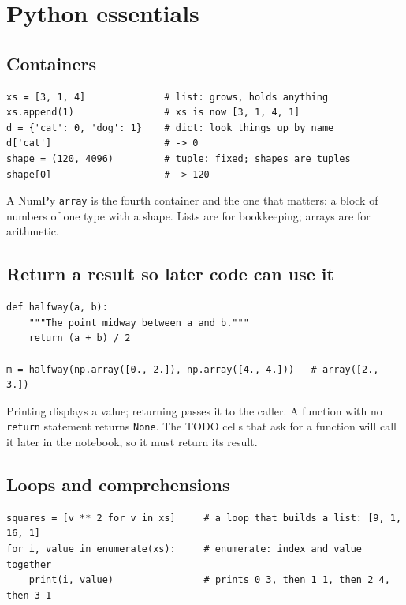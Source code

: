 \documentclass[11pt]{article}
\begin{document}
\section{Python essentials}\label{sec:python}

\subsection{Containers}

\begin{codebox}
\begin{verbatim}
xs = [3, 1, 4]              # list: grows, holds anything
xs.append(1)                # xs is now [3, 1, 4, 1]
d = {'cat': 0, 'dog': 1}    # dict: look things up by name
d['cat']                    # -> 0
shape = (120, 4096)         # tuple: fixed; shapes are tuples
shape[0]                    # -> 120
\end{verbatim}
\end{codebox}

A NumPy \texttt{array} is the fourth container and the one that matters: a block of
numbers of one type with a shape. Lists are for bookkeeping; arrays are for arithmetic.

\subsection{Return a result so later code can use it}

\begin{codebox}
\begin{verbatim}
def halfway(a, b):
    """The point midway between a and b."""
    return (a + b) / 2

m = halfway(np.array([0., 2.]), np.array([4., 4.]))   # array([2., 3.])
\end{verbatim}
\end{codebox}

Printing displays a value; returning passes it to the caller. A function with no
\texttt{return} statement returns \texttt{None}. The TODO cells that ask for a function
will call it later in the notebook, so it must return its result.

\subsection{Loops and comprehensions}

\begin{codebox}
\begin{verbatim}
squares = [v ** 2 for v in xs]     # a loop that builds a list: [9, 1, 16, 1]
for i, value in enumerate(xs):     # enumerate: index and value together
    print(i, value)                # prints 0 3, then 1 1, then 2 4, then 3 1
\end{verbatim}
\end{codebox}
\end{document}
